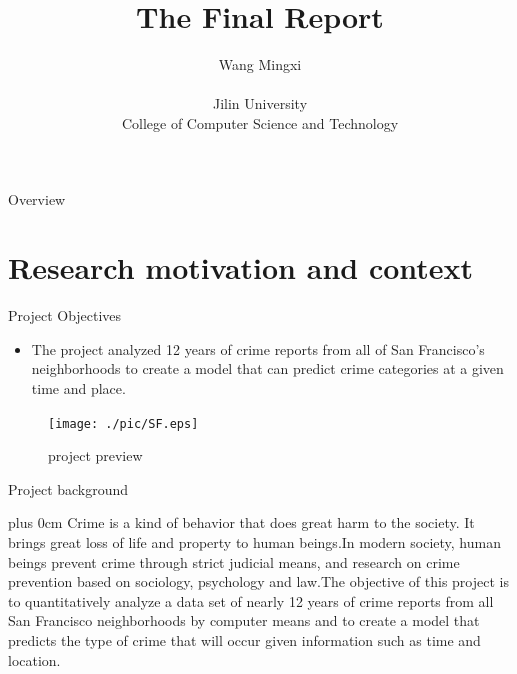 \documentclass[
 size=14pt,
 paper=smartboard,  %
 mode=present, 		%
 display=slides, 	%
 style=tuliplab,  	%
 pauseslide,
 fleqn,leqno]{powerdot}
\title{The Final Report}
\author{
Wang Mingxi
\\
\\Jilin University
\\College of Computer Science and Technology
}
\date{\gitCommitterDate}
\renewcommand{\raggedright}{\leftskip=0pt \rightskip=0pt plus 0cm}
\begin{document}
\maketitle



\begin{slide}[toc=,bm=]{Overview}
\tableofcontents[content=currentsection,type=1]
\end{slide}


\section{Research motivation and context}

\begin{slide}{Project Objectives}

\begin{itemize}
\item The project analyzed 12 years of crime reports from all of San Francisco's neighborhoods to create a model that can predict crime categories at a given time and place.

\end{itemize}

\begin{center}
	\begin{figure}[htbp]
		\texttt{[image: ./pic/SF.eps]}
		\caption{project preview}
	\end{figure}
\end{center}

\end{slide}

\begin{slide}{Project background}

\raggedright
Crime is a kind of behavior that does great harm to the society. It brings great loss of life and property to human beings.In modern society, human beings prevent crime through strict judicial means, and research on crime prevention based on sociology, psychology and law.The objective of this project is to quantitatively analyze a data set of nearly 12 years of crime reports from all San Francisco neighborhoods by computer means and to create a model that predicts the type of crime that will occur given information such as time and location.

\end{slide}
\end{document}
